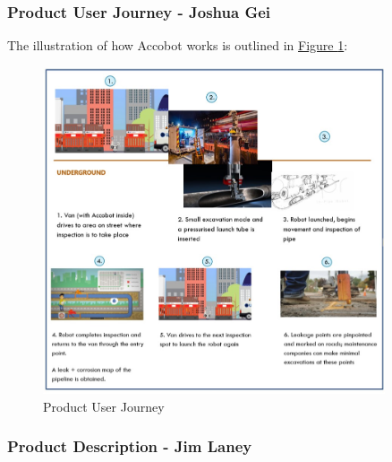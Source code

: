 \documentclass[11pt]{article}		%
\newcommand{\figref}[1]{\hyperref[#1]{Figure \ref*{#1}}}    %
\newcommand{\sectref}[1]{\hyperref[#1]{Section \ref*{#1}}}     %
\begin{document}
	\subsubsection[Product User Journey]{Product User Journey - Joshua Gei}
	The illustration of how Accobot works is outlined in \figref{userjourney}:
	\begin{figure}[h]
				\centering
				\includegraphics[width=0.9\textwidth]{userjourneyfull.jpg}
				\caption{Product User Journey}
				\label{userjourney}
			\end{figure}
	
	
	\subsubsection[Product Description]{Product Description - Jim Laney}
	        
\end{document}
